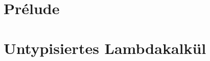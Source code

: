 \documentclass{scrbook}
\begin{document}
\tableofcontents
\newpage


\part{Prélude}


\part{Untypisiertes Lambdakalkül}




\newpage
\listoftodos
\end{document}
